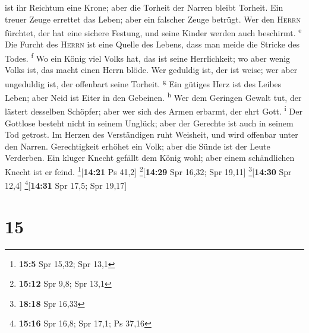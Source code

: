 ist ihr Reichtum eine Krone; aber die Torheit der Narren bleibt Torheit.
 Ein treuer Zeuge errettet das Leben; aber ein falscher
Zeuge betrügt.  Wer den \textsc{Herrn} fürchtet, der hat
eine sichere Festung, und seine Kinder werden auch beschirmt.
\textsuperscript{e}  Die Furcht des \textsc{Herrn} ist
eine Quelle des Lebens, dass man meide die Stricke des Todes.
\textsuperscript{f}  Wo ein König viel Volks hat, das ist
seine Herrlichkeit; wo aber wenig Volks ist, das macht einen Herrn
blöde.  Wer geduldig ist, der ist weise; wer aber
ungeduldig ist, der offenbart seine Torheit. \textsuperscript{g}
 Ein gütiges Herz ist des Leibes Leben; aber Neid ist
Eiter in den Gebeinen. \textsuperscript{h}  Wer dem
Geringen Gewalt tut, der lästert desselben Schöpfer; aber wer sich des
Armen erbarmt, der ehrt Gott. \textsuperscript{i}  Der
Gottlose besteht nicht in seinem Unglück; aber der Gerechte ist auch in
seinem Tod getrost.  Im Herzen des Verständigen ruht
Weisheit, und wird offenbar unter den Narren. 
Gerechtigkeit erhöhet ein Volk; aber die Sünde ist der Leute Verderben.
 Ein kluger Knecht gefällt dem König wohl; aber einem
schändlichen Knecht ist er feind. \footnote{\textbf{15:5} Spr 15,32; Spr
  13,1}{[}\textbf{14:21} Ps 41,2{]} \footnote{\textbf{15:12} Spr 9,8;
  Spr 13,1}{[}\textbf{14:29} Spr 16,32; Spr 19,11{]}
\footnote{\textbf{18:18} Spr 16,33}{[}\textbf{14:30} Spr 12,4{]}
\footnote{\textbf{15:16} Spr 16,8; Spr 17,1; Ps 37,16}{[}\textbf{14:31}
Spr 17,5; Spr 19,17{]}

\hypertarget{section-14}{%
\section{15}\label{section-14}}


